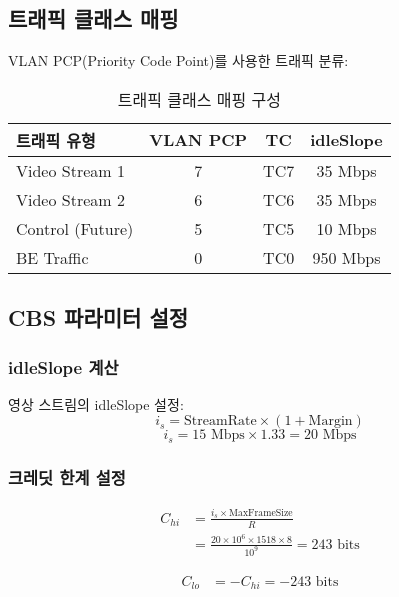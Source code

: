 \documentclass[10pt,twocolumn]{IEEEtran}
\begin{document}
\subsection{트래픽 클래스 매핑}

VLAN PCP(Priority Code Point)를 사용한 트래픽 분류:

\begin{table}[h]
\centering
\caption{트래픽 클래스 매핑 구성}
\begin{tabular}{lccc}
\toprule
\textbf{트래픽 유형} & \textbf{VLAN PCP} & \textbf{TC} & \textbf{idleSlope} \\
\midrule
Video Stream 1 & 7 & TC7 & 35 Mbps \\
Video Stream 2 & 6 & TC6 & 35 Mbps \\
Control (Future) & 5 & TC5 & 10 Mbps \\
BE Traffic & 0 & TC0 & 950 Mbps \\
\bottomrule
\end{tabular}
\end{table}

\subsection{CBS 파라미터 설정}

\subsubsection{idleSlope 계산}
영상 스트림의 idleSlope 설정:
\begin{equation}
i_s = \text{StreamRate} \times (1 + \text{Margin})
\end{equation}
\begin{equation}
i_s = 15 \text{ Mbps} \times 1.33 = 20 \text{ Mbps}
\end{equation}

\subsubsection{크레딧 한계 설정}
\begin{align}
C_{hi} &= \frac{i_s \times \text{MaxFrameSize}}{R} \\
&= \frac{20 \times 10^6 \times 1518 \times 8}{10^9} = 243 \text{ bits}
\end{align}

\begin{align}
C_{lo} &= -C_{hi} = -243 \text{ bits}
\end{align}
\end{document}
